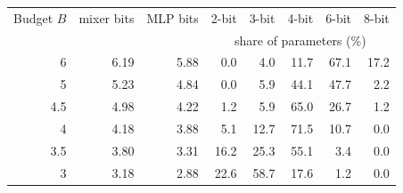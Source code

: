\begin{tabular}{rrrrrrrr}
\toprule
Budget $B$ & mixer bits & MLP bits & 2-bit & 3-bit & 4-bit & 6-bit & 8-bit \\
 & & & \multicolumn{5}{c}{share of parameters (\%)} \\
\midrule
6 & 6.19 & 5.88 & 0.0 & 4.0 & 11.7 & 67.1 & 17.2 \\
5 & 5.23 & 4.84 & 0.0 & 5.9 & 44.1 & 47.7 & 2.2 \\
4.5 & 4.98 & 4.22 & 1.2 & 5.9 & 65.0 & 26.7 & 1.2 \\
4 & 4.18 & 3.88 & 5.1 & 12.7 & 71.5 & 10.7 & 0.0 \\
3.5 & 3.80 & 3.31 & 16.2 & 25.3 & 55.1 & 3.4 & 0.0 \\
3 & 3.18 & 2.88 & 22.6 & 58.7 & 17.6 & 1.2 & 0.0 \\
\bottomrule
\end{tabular}
